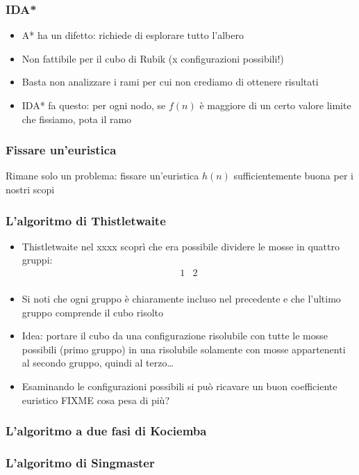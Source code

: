 \documentclass{beamer}
\begin{document}
\begin{frame}
\frametitle{IDA*}
\begin{itemize}
\item A* ha un difetto: richiede di esplorare tutto l'albero
\item Non fattibile per il cubo di Rubik (x configurazioni possibili!)
\item Basta non analizzare i rami per cui non crediamo di ottenere risultati
\item IDA* fa questo: per ogni nodo, se $f(n)$ è maggiore di un certo valore
limite che fissiamo, pota il ramo
\end{itemize}
\end{frame}

\begin{frame}
\frametitle{Fissare un'euristica}
Rimane solo un problema: fissare un'euristica $h(n)$ sufficientemente buona per
i nostri scopi
\end{frame}

\begin{frame}
\frametitle{L'algoritmo di Thistletwaite}
\begin{itemize}
\item Thistletwaite nel xxxx scoprì che era possibile dividere le mosse in
quattro gruppi:
\begin{align*}
1 & 2 \\
\end{align*}
\item Si noti che ogni gruppo è chiaramente incluso nel precedente e che 
l'ultimo gruppo comprende il cubo risolto
\item Idea: portare il cubo da una configurazione risolubile con tutte le mosse 
possibili (primo gruppo) in una risolubile solamente con mosse appartenenti al
secondo gruppo, quindi al terzo\dots
\item Esaminando le configurazioni possibili si può ricavare un buon 
coefficiente euristico FIXME cosa pesa di più?
\end{itemize}
\end{frame}

\begin{frame}
\frametitle{L'algoritmo a due fasi di Kociemba}
\end{frame}

\begin{frame}
\frametitle{L'algoritmo di Singmaster}
\end{frame}
\end{document}
